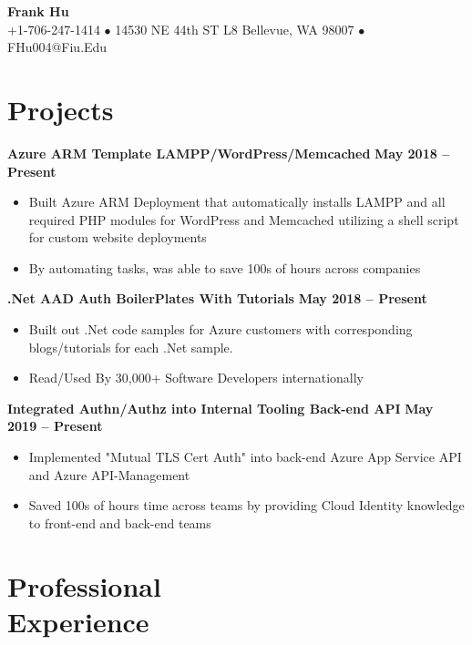 \documentclass[margin,line]{resume}
\begin{document}
	{\centering \LARGE{\textbf{Frank Hu}}}
	\\
	\normalsize
	+1-706-247-1414 $\bullet$ 14530 NE 44th ST L8 Bellevue, WA 98007 $\bullet$ FHu004@Fiu.Edu
	
	\begin{resume}	
		
	
	\section{\mysidestyle Projects}
	
	\textbf{Azure ARM Template LAMPP/WordPress/Memcached}  \hfill \textbf{May 2018 -- Present}
	\vspace{1mm}
	\begin{itemize}
		\item Built Azure ARM Deployment that automatically installs LAMPP and all required PHP modules for WordPress and Memcached utilizing a shell script for custom website deployments
		\item By automating tasks, was able to save 100s of hours across companies
	\end{itemize}

	\textbf{.Net AAD Auth BoilerPlates With Tutorials}  \hfill \textbf{May 2018 -- Present}
	\vspace{1mm}
	\begin{itemize}
		\item Built out .Net code samples for Azure customers with corresponding blogs/tutorials for each .Net sample.
		\item Read/Used By 30,000+ Software Developers internationally
	\end{itemize}
	
	\textbf{Integrated Authn/Authz into Internal Tooling Back-end API}  \hfill \textbf{May 2019 -- Present}
	\vspace{1mm}
	\begin{itemize}
		\item Implemented "Mutual TLS Cert Auth" into back-end Azure App Service API and Azure API-Management 
		\item Saved 100s of hours time across teams by providing Cloud Identity knowledge to front-end and back-end teams
	\end{itemize}
		
	\section{\mysidestyle Professional\\Experience}
	

\end{resume}
\end{document}
